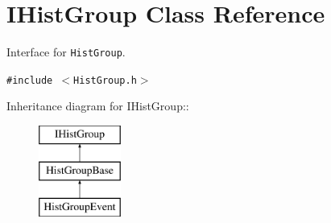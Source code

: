 \hypertarget{classIHistGroup}{
\section{IHist\-Group Class Reference}
\label{classIHistGroup}
}
Interface for {\tt Hist\-Group}.  


{\tt \#include $<$Hist\-Group.h$>$}

Inheritance diagram for IHist\-Group::\begin{figure}[H]
\begin{center}
\leavevmode
\includegraphics[height=3cm]{classIHistGroup}
\end{center}
\end{figure}
